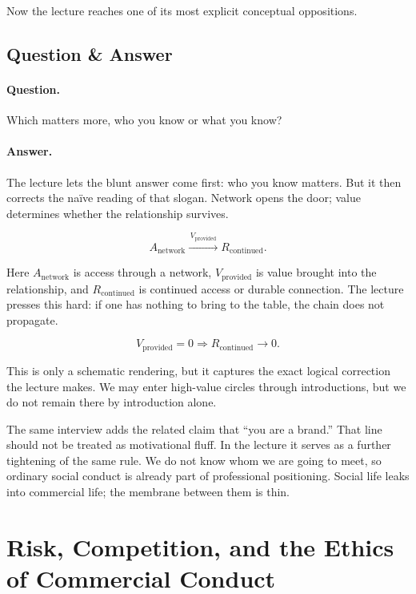 Now the lecture reaches one of its most explicit conceptual oppositions.

\subsection{Question \& Answer}

\paragraph{Question.} Which matters more, who you know or what you know?

\paragraph{Answer.} The lecture lets the blunt answer come first: who you know matters. But it then corrects the naïve reading of that slogan. Network opens the door; value determines whether the relationship survives.

\begin{equation}
A_{\mathrm{network}} \xrightarrow{\,V_{\mathrm{provided}}\,} R_{\mathrm{continued}}.
\end{equation}

Here \(A_{\mathrm{network}}\) is access through a network, \(V_{\mathrm{provided}}\) is value brought into the relationship, and \(R_{\mathrm{continued}}\) is continued access or durable connection. The lecture presses this hard: if one has nothing to bring to the table, the chain does not propagate.

\begin{equation}
V_{\mathrm{provided}} = 0 \Rightarrow R_{\mathrm{continued}} \to 0.
\end{equation}

This is only a schematic rendering, but it captures the exact logical correction the lecture makes. We may enter high-value circles through introductions, but we do not remain there by introduction alone.

The same interview adds the related claim that ``you are a brand.'' That line should not be treated as motivational fluff. In the lecture it serves as a further tightening of the same rule. We do not know whom we are going to meet, so ordinary social conduct is already part of professional positioning. Social life leaks into commercial life; the membrane between them is thin.

\section{Risk, Competition, and the Ethics of Commercial Conduct}

